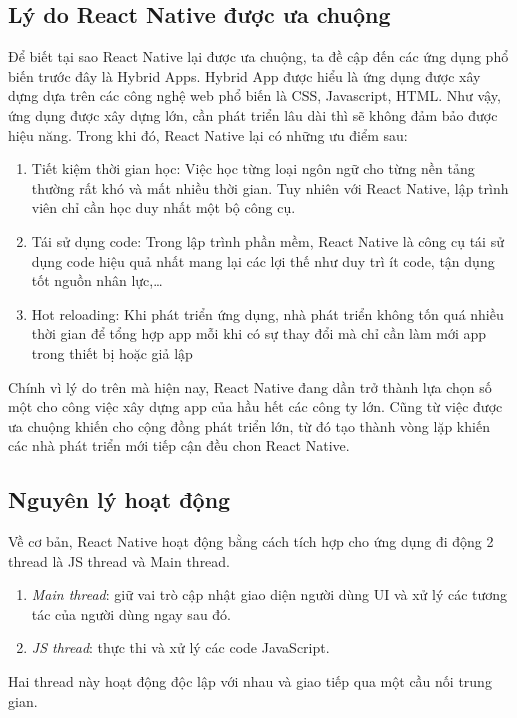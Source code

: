 \subsection{Lý do React Native được ưa chuộng}
Để biết tại sao React Native lại được ưa chuộng, ta đề cập đến các ứng dụng phổ biến trước đây là Hybrid Apps. Hybrid App được hiểu là ứng dụng được xây dựng dựa trên các công nghệ web phổ biến là CSS, Javascript, HTML. Như vậy, ứng dụng được xây dựng lớn, cần phát triển lâu dài thì sẽ không đảm bảo được hiệu năng.
\newline
Trong khi đó, React Native lại có những ưu điểm sau:
\begin{enumerate}
    \item {Tiết kiệm thời gian học:} Việc học từng loại ngôn ngữ cho từng nền tảng thường rất khó và mất nhiều thời gian. Tuy nhiên với React Native, lập trình viên chỉ cần học duy nhất một bộ công cụ.
    \item {Tái sử dụng code:} Trong lập trình phần mềm, React Native là công cụ tái sử dụng code hiệu quả nhất mang lại các lợi thế như duy trì ít code, tận dụng tốt nguồn nhân lực,\dots
    \item {Hot reloading:} Khi phát triển ứng dụng, nhà phát triển không tốn quá nhiều thời gian để tổng hợp app mỗi khi có sự thay đổi mà chỉ cần làm mới app trong thiết bị hoặc giả lập
\end{enumerate}
Chính vì lý do trên mà hiện nay, React Native  đang dần trở thành lựa chọn số một cho công việc xây dựng app của hầu hết các công ty lớn. Cũng từ việc được ưa chuộng khiến cho cộng đồng phát triển lớn, từ đó tạo thành vòng lặp khiến các nhà phát triển mới tiếp cận đều chon React Native.

\subsection{Nguyên lý hoạt động}
Về cơ bản, React Native hoạt động bằng cách tích hợp cho ứng dụng đi động 2 thread là JS thread và Main thread.
\begin{enumerate}
    \item{\textit{Main thread}}: giữ vai trò cập nhật giao diện người dùng UI và xử lý các tương tác của người dùng ngay sau đó.
    \item{\textit{JS thread}}: thực thi và xử lý các code JavaScript.
\end{enumerate}
Hai thread này hoạt động độc lập với nhau và giao tiếp qua một cầu nối trung gian.

